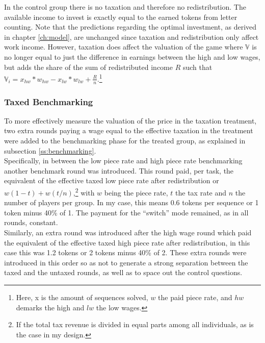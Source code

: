     In the control group there is no taxation and therefore no redistribution. The available income to invest is exactly equal to the earned tokens from letter counting. Note that the predictions regarding the optimal investment, as derived in chapter \ref{ch:model}, are unchanged since taxation and redistribution only affect work income. However, taxation does affect the valuation of the game where $\mathbb{V}$ is no longer equal to just the difference in earnings between the high and low wages, but adds the share of the sum of redistributed income $R$ such that $\mathbb{V}_i = x_{hw}*w_{hw} - x_{lw}*w_{lw} + \frac{R}{n}$.\footnote{Here, x is the amount of sequences solved, $w$ the paid piece rate, and $hw$ demarks the high and $lw$ the low wages.}  
    
    \subsubsection{Taxed Benchmarking}
    \label{ss:tax_bench}
    
    To more effectively measure the valuation of the price in the taxation treatment, two extra rounds paying a wage equal to the effective taxation in the treatment were added to the benchmarking phase for the treated group, as explained in subsection \ref{ss:benchmarking}.\\
    
    Specifically, in between the low piece rate and high piece rate benchmarking another benchmark round was introduced. This round paid, per task, the equivalent of the effective taxed low piece rate after redistribution or $w(1-t)+ w(t/n)$,\footnote{If the total tax revenue is divided in equal parts among all individuals, as is the case in my design.} with $w$ being the piece rate, $t$ the tax rate and $n$ the number of players per group. In my case, this means 0.6 tokens per sequence or 1 token minus 40\% of 1. The payment for the ``switch'' mode remained, as in all rounds, constant.\\
    
    Similarly, an extra round was introduced after the high wage round which paid the equivalent of the effective taxed high piece rate after redistribution, in this case this was 1.2 tokens or 2 tokens minus 40\% of 2. These extra rounds were introduced in this order so as not to generate a strong separation between the taxed and the untaxed rounds, as well as to space out the control questions. \\ 
    

